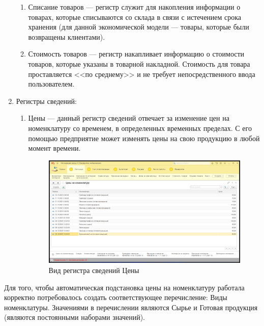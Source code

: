 \documentclass[12pt,a4paper]{article}
\begin{document}
\begin{enumerate}
\begin{enumerate}
            \item Списание товаров --- регистр служит для накопления информации о товарах, которые списываются со склада в связи с истечением срока хранения (для данной экономической модели --- товары, которые были возвращены клиентами).
            
            \item Стоимость товаров --- регистр накапливает информацию о стоимости товаров, которые указаны в товарной накладной. Стоимость для товара проставляется <<по среднему>> и не требует непосредственного ввода пользователем.
        \end{enumerate}
        
    \item Регистры сведений:
    
        \begin{enumerate}
            \item Цены --- данный регистр сведений отвечает за изменение цен на номенклатуру со временем, в определенных временных пределах. С его помощью предприятие может изменять цены на свою продукцию в любой момент времени.
            
            \begin{figure}[!ht]
                \centering
                \includegraphics[scale=0.4]{Пример регистра сведений.png}
                \caption{Вид регистра сведений Цены}
                \label{fig:information}
            \end{figure}
        \end{enumerate}
\end{enumerate}

Для того, чтобы автоматическая подстановка цены на номенклатуру работала корректно потребовалось создать соответствующее перечисление: Виды номенклатуры. Значениями в перечислении являются Сырье и Готовая продукция (являются постоянными наборами значений).
\end{document}
